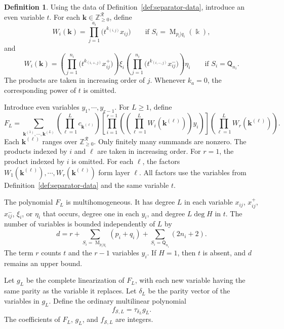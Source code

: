 \documentclass[11pt,reqno]{amsart}
\newcommand{\kk}{\Bbbk}
\newcommand{\Mat}{\operatorname{M}}
\newcommand{\Qtype}{\mathsf Q}
\theoremstyle{definition}
\newtheorem{definition}[theorem]{Definition}
\theoremstyle{remark}
\numberwithin{equation}{section}
\begin{document}
\begin{definition}\label{def:separating-polynomials}
Using the data of Definition~\ref{def:separator-data}, introduce
an even variable $t$.
For each $\mathbf k\in\mathbb Z_{\geq0}^{\mathcal R}$, define
\[
W_i(\mathbf k)
=
\prod_{j=1}^{a_i}
\bigl(t^{k_{(i,j)}}x_{ij}\bigr)
\qquad
\text{if }S_i=\Mat_{p_i|q_i}(\kk),
\]
and
\[
W_i(\mathbf k)
=
\left(
\prod_{j=1}^{n_i}
\bigl(t^{k_{(i,+,j)}}x^+_{ij}\bigr)
\right)\xi_i
\left(
\prod_{j=1}^{n_i}
\bigl(t^{k_{(i,-,j)}}x^-_{ij}\bigr)
\right)\eta_i
\qquad
\text{if }S_i=\Qtype_{n_i}.
\]
The products are taken in increasing order of $j$.
Whenever $k_a=0$, the corresponding power of $t$ is omitted.


Introduce even variables $y_1,\cdots,y_{r-1}$.
For $L\geq1$, define
\begin{equation}\label{eq:FL}
F_L=
\sum_{\mathbf k^{(1)},\cdots,\mathbf k^{(L)}}
\left(\prod_{\ell=1}^L c_{\mathbf k^{(\ell)}}\right)
\left[
\prod_{i=1}^{r-1}
\left(
\left(\prod_{\ell=1}^L W_i(\mathbf k^{(\ell)})\right)y_i
\right)
\right]
\left(\prod_{\ell=1}^L W_r(\mathbf k^{(\ell)})\right).
\end{equation}
Each $\mathbf k^{(\ell)}$ ranges over
$\mathbb Z_{\geq0}^{\mathcal R}$.
Only finitely many summands are nonzero.
The products indexed by $i$ and $\ell$ are taken in
increasing order. For $r=1$, the product indexed by $i$
is omitted.
For each $\ell$, the factors
$W_1(\mathbf k^{(\ell)}),\cdots,W_r(\mathbf k^{(\ell)})$
form layer $\ell$.
All factors use the variables from Definition~\ref{def:separator-data}
and the same variable $t$.

The polynomial $F_L$ is multihomogeneous.
It has degree $L$ in each variable $x_{ij}$, $x^+_{ij}$,
$x^-_{ij}$, $\xi_i$, or $\eta_i$ that occurs, degree one
in each $y_i$, and degree $L\deg H$ in $t$.
The number of variables is bounded independently of $L$ by
\begin{equation}\label{eq:variable-bound}
d=r+\sum_{S_i=\Mat_{p_i|q_i}}(p_i+q_i)
  +\sum_{S_i=\Qtype_{n_i}}(2n_i+2).
\end{equation}
The term $r$ counts $t$ and the $r-1$ variables $y_i$.
If $H=1$, then $t$ is absent, and $d$ remains an upper bound.


Let $g_L$ be the complete linearization of $F_L$,
with each new variable having the same parity as
the variable it replaces.
Let $\delta_L$ be the parity vector of the variables in $g_L$.
Define the ordinary multilinear polynomial
\[
f_{\mathcal S,L}=\tau_{\delta_L}g_L.
\]
The coefficients of $F_L$, $g_L$, and $f_{\mathcal S,L}$
are integers.
\end{definition}
\end{document}
